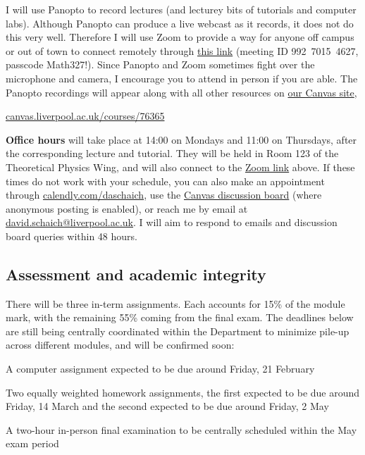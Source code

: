 I will use Panopto to record lectures (and lecturey bits of tutorials and computer labs).
Although Panopto can produce a live webcast as it records, it does not do this very well. %
Therefore I will use Zoom to provide a way for anyone off campus or out of town to connect remotely through \href{https://liverpool-ac-uk.zoom.us/j/99270154627?pwd=opN8TdnbW3xELD4gxPGgAdkIbL61uk.1}{this link} (meeting ID \mbox{992 7015 4627}, passcode Math327!).
Since Panopto and Zoom sometimes fight over the microphone and camera, I encourage you to attend in person if you are able.
The Panopto recordings will appear along with all other resources on \href{https://canvas.liverpool.ac.uk/courses/76365}{our Canvas site}, \\
\centerline{\href{https://canvas.liverpool.ac.uk/courses/76365}{canvas.liverpool.ac.uk/courses/76365}}

\textbf{Office hours} will take place at 14:00 on Mondays and 11:00 on Thursdays, after the corresponding lecture and tutorial.
They will be held in Room 123 of the Theoretical Physics Wing, and will also connect to the \href{https://liverpool-ac-uk.zoom.us/j/99270154627?pwd=opN8TdnbW3xELD4gxPGgAdkIbL61uk.1}{Zoom link} above.
If these times do not work with your schedule, you can also make an appointment through \href{https://calendly.com/daschaich/meet}{calendly.com/daschaich}, use the \href{https://canvas.liverpool.ac.uk/courses/76365/discussion_topics}{Canvas discussion board} (where anonymous posting is enabled), or reach me by email at \href{mailto:david.schaich@liverpool.ac.uk}{david.schaich@liverpool.ac.uk}.
I will aim to respond to emails and discussion board queries within 48 hours.



\subsection*{Assessment and academic integrity}
There will be three in-term assignments.
Each accounts for 15\% of the module mark, with the remaining 55\% coming from the final exam.
The deadlines below are still being centrally coordinated within the Department to minimize pile-up across different modules, and will be confirmed soon: \\[-28 pt]
\begin{description}
  \setlength{\itemsep}{5pt}
  \setlength{\parskip}{5pt}
  \setlength{\parsep}{5pt}
  \item[15\%] A computer assignment expected to be due around Friday, 21 February
  \item[30\%] Two equally weighted homework assignments, the first expected to be due around Friday, 14 March and the second expected to be due around Friday, 2 May
  \item[55\%] A two-hour in-person final examination to be centrally scheduled within the May exam period
\end{description}
\ \\[-50 pt]

